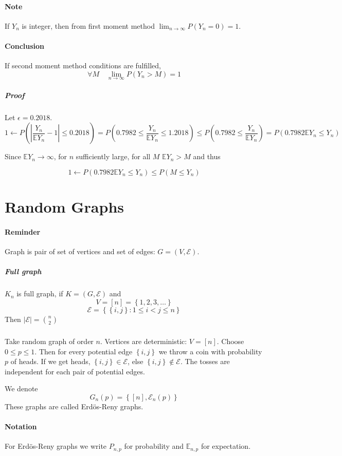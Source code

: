 \paragraph{Note}
If $Y_n$ is integer, then from first moment method $\lim_{n \to \infty} P(Y_n = 0) = 1$.
\paragraph{Conclusion}
If second moment method conditions are fulfilled, 
$$\forall M \quad \lim_{n \to \infty } P(Y_n > M) = 1$$
\subparagraph{Proof}
Let $\epsilon = 0.2018$.
$$1 \leftarrow P \left( \left| \frac{Y_n}{\mathbb{E} Y_n} - 1 \right| \leq 0.2018 \right) = P \left(0.7982 \leq   \frac{Y_n}{\mathbb{E} Y_n}   \leq 1.2018 \right) \leq P \left( 0.7982 \leq \frac{Y_n}{\mathbb{E} Y_n}  \right) = P \left(0.7982 \mathbb{E} Y_n \leq Y_n \right)$$

Since $\mathbb{E} Y_n \to \infty$, for $n$ sufficiently large, for all $M$ $\mathbb{E} Y_n>M$ and thus

$$1 \leftarrow  P \left(0.7982 \mathbb{E} Y_n \leq Y_n \right) \leq  P \left(M \leq Y_n \right)$$
\section{Random Graphs}
\paragraph{Reminder}
Graph is pair of set of vertices and set of edges: $G= \left(V, \mathcal{E}\right)$.
\subparagraph{Full graph}
$K_n$ is full graph, if $K=(G, \mathcal{E})$ and 
$$V = [n] = \left\{ 1,2,3,\dots \right\}$$
$$\mathcal{E} = \left\{  \left\{ i,j \right\}: 1\leq i < j \leq n \right\}$$
Then $|\mathcal{E}| = \binom{n}{2}$
\subparagraph{}
Take random graph of order $n$. Vertices are deterministic: $V = [n]$. Choose $0\leq p\leq 1$. Then for every potential edge $\left\{i,j\right\} $ we throw a coin with probability $p$ of heads. If we get heads, $\left\{i,j\right\} \in \mathcal{E}$, else $\left\{i,j\right\} \notin \mathcal{E}$. The tosses are independent for each pair of potential edges.

We denote
$$G_n(p) = \left\{ [n], \mathcal{E}_n(p) \right\}$$
These graphs are called Erd\"{o}s-Reny graphs.

\paragraph{Notation}
For Erd\"{o}s-Reny graphs we write $P_{n,p}$ for probability and $\mathbb{E}_{n,p}$ for expectation.
